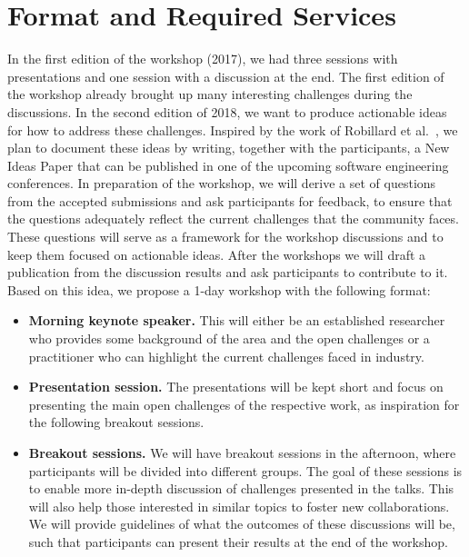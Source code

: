\documentclass[10pt, conference]{IEEEtran}
\newcommand{\updated}[1]{#1}
\begin{document}
\section{Format and Required Services}

\updated{In the first edition of the workshop (2017), we had three sessions with presentations and one session with a discussion at the end. The first edition of the workshop already brought up many interesting challenges during the discussions. In the second edition of 2018, we want to produce actionable ideas for how to address these challenges. Inspired by the work of Robillard et al.~\cite{RMT+17}, we plan to document these ideas by writing, together with the participants, a New Ideas Paper that can be published in one of the upcoming software engineering conferences. In preparation of the workshop, we will derive a set of questions from the accepted submissions and ask participants for feedback, to ensure that the questions adequately reflect the current challenges that the community faces. These questions will serve as a framework for the workshop discussions and to keep them focused on actionable ideas. After the workshops we will draft a publication from the discussion results and ask participants to contribute to it.
%
Based on this idea,} we propose a 1-day workshop with the following format:

\begin{itemize}
\setlength\itemsep{5pt}
\item \textbf{Morning keynote speaker.} This will either be an established researcher who provides some background of the area and the open challenges or a practitioner who can highlight the current challenges faced in industry.
\item \textbf{Presentation session.} \updated{The presentations will be kept short and focus on presenting the main open challenges of the respective work, as inspiration for the following breakout sessions.}
\item \textbf{Breakout sessions.} \updated{We will have breakout sessions in the afternoon, where participants will be divided into different groups. The goal of these sessions is to enable more in-depth discussion of challenges presented in the talks. This will also help those interested in similar topics to foster new collaborations. We will provide guidelines of what the outcomes of these discussions will be, such that participants can present their results at the end of the workshop.}
\end{itemize}
\end{document}
